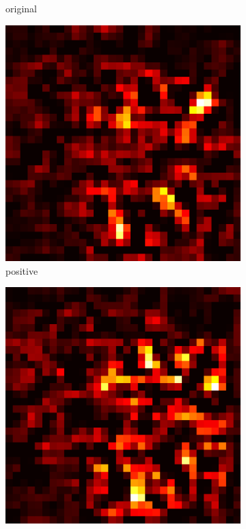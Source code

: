 \documentclass[preprint,12pt]{elsarticle}
\begin{document}
\begin{figure}
\begin{subfigure}{0.14\linewidth}
        \caption{original}
    \end{subfigure}
    \hfill
    \begin{subfigure}{0.14\textwidth}
        \centering
        \includegraphics[width=\linewidth]{../visualizations/examples/cifar10/cnn/positive_saliency_map/1.png}
        \caption{positive}
    \end{subfigure}
    \hfill
    \begin{subfigure}{0.14\textwidth}
        \centering
        \includegraphics[width=\linewidth]{../visualizations/examples/cifar10/cnn/negative_saliency_map/1.png}

\end{subfigure}
\end{figure}
\end{document}
